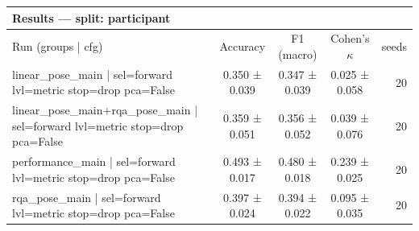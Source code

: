 \begin{tabular}{lccc r}
\toprule
\multicolumn{5}{l}{\textbf{Results — split: participant}} \\
\midrule
Run (groups | cfg) & Accuracy & F1 (macro) & Cohen's $\kappa$ & seeds \\
\midrule
linear_pose_main | sel=forward lvl=metric stop=drop pca=False & 0.350 ± 0.039 & 0.347 ± 0.039 & 0.025 ± 0.058 & 20 \\
linear_pose_main+rqa_pose_main | sel=forward lvl=metric stop=drop pca=False & 0.359 ± 0.051 & 0.356 ± 0.052 & 0.039 ± 0.076 & 20 \\
performance_main | sel=forward lvl=metric stop=drop pca=False & 0.493 ± 0.017 & 0.480 ± 0.018 & 0.239 ± 0.025 & 20 \\
rqa_pose_main | sel=forward lvl=metric stop=drop pca=False & 0.397 ± 0.024 & 0.394 ± 0.022 & 0.095 ± 0.035 & 20 \\
\bottomrule
\end{tabular}